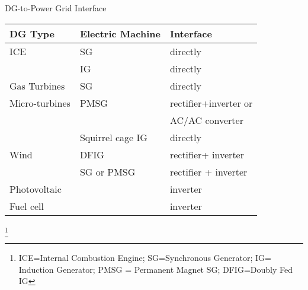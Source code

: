 \documentclass[10pt]{beamer}
\begin{document}

\begin{frame} {DG-to-Power Grid Interface}

\begin{center}
\begin{tabular}{lll}
\toprule
DG Type & Electric Machine & Interface \\
\midrule
ICE & SG & directly \\
& IG & directly \\
Gas Turbines & SG & directly \\
Micro-turbines & PMSG & rectifier+inverter or\\ &&
 AC/AC converter \\
 & Squirrel cage IG & directly \\
Wind & DFIG & rectifier+ inverter \\
 & SG or PMSG & rectifier + inverter\\
Photovoltaic && inverter\\
Fuel cell&  & inverter\\
\bottomrule
\end{tabular}
\end{center}
\footnote{ICE=Internal Combustion Engine; SG=Synchronous Generator; IG= Induction Generator; PMSG = Permanent Magnet SG; DFIG=Doubly Fed IG}
\end{frame}

%
%
%
%
%
\end{document}
